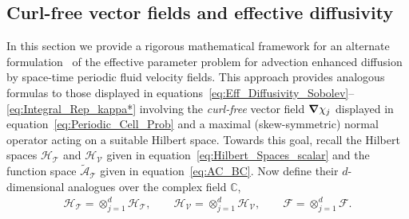 \documentclass[leqno,onefignum,onetabnum]{siamltex1213}
\newcommand{\Tc}{\mathcal{T}}
\newcommand{\Vc}{\mathcal{V}}
\newcommand{\Hc}{\mathcal{H}}
\newcommand{\Fc}{\mathcal{F}}
\newcommand{\Hs}{\mathscr{H}}
\newcommand{\As}{\mathscr{A}}
\newcommand{\Fs}{\mathscr{F}}
\newcommand\bnabla{\mbox{\boldmath${\nabla}$}}
\begin{document}
\subsection{Curl-free vector fields and effective diffusivity}
\label{sec:Curl_Free_Fields}
%
In this section we provide a rigorous mathematical framework for an
alternate formulation~\cite{Avellaneda:PRE:3249} of the effective
parameter problem for advection enhanced diffusion by space-time
periodic fluid velocity fields.  This approach provides analogous
formulas to those displayed in
equations~\eqref{eq:Eff_Diffusivity_Sobolev}--\eqref{eq:Integral_Rep_kappa*}
involving the \emph{curl-free} vector field $\bnabla\chi_j$ displayed in
equation~\eqref{eq:Periodic_Cell_Prob} and a maximal (skew-symmetric)
normal operator acting on a suitable Hilbert space. Towards this goal,
recall the Hilbert spaces $\Hs_{\Tc}$ and $\Hs_{\Vc}$ given in
equation~\eqref{eq:Hilbert_Spaces_scalar} and the function space
$\tilde{\As}_{\Tc}$ given in equation~\eqref{eq:AC_BC}. Now define
their $d$-dimensional analogues over the complex field $\mathbb{C}$,  
%
\begin{align}\label{eq:Hilbert_Spaces_vector}
  \Hc_{\Tc}=\otimes_{j=1}^d\Hs_{\Tc}, \qquad
  \Hc_{\Vc}=\otimes_{j=1}^d\Hs_{\Vc}, \qquad
  \Fc=\otimes_{j=1}^d\Fs.
\end{align}
%
\end{document}
